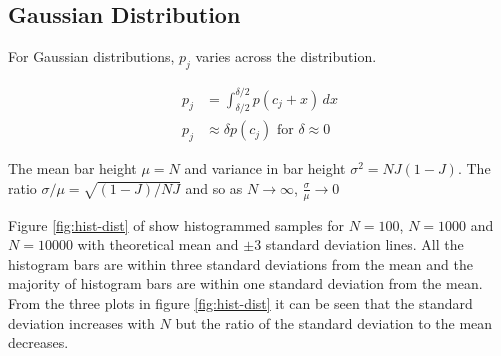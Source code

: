\documentclass[12pt]{article}
\begin{document}
\subsection{Gaussian Distribution}

For Gaussian distributions, $p_j$ varies across the distribution.

\begin{align}
	p_j &= \int_{\delta/2}^{\delta/2}  p(c_j + x) \, dx \\
    p_j &\approx \delta p(c_j) \mbox{ for } \delta \approx 0
\end{align}

The mean bar height  $\mu = N$ and variance in bar height $\sigma^2 = NJ(1-J)$. The ratio $\sigma / \mu = \sqrt {(1-J) / NJ}$ and so as $N \to \infty$, $\frac \sigma \mu \to 0$

Figure \ref{fig:hist-dist} of show histogrammed samples for $N=100$,  $N=1000$ and $N=10000$ with theoretical mean and $\pm 3$ standard deviation lines. All the histogram bars are within three standard deviations from the mean and the majority of histogram bars are within one standard deviation from the mean. From the three plots in figure \ref{fig:hist-dist} it can be seen that the standard deviation increases with $N$ but the ratio of the standard deviation to the mean decreases.
\end{document}
